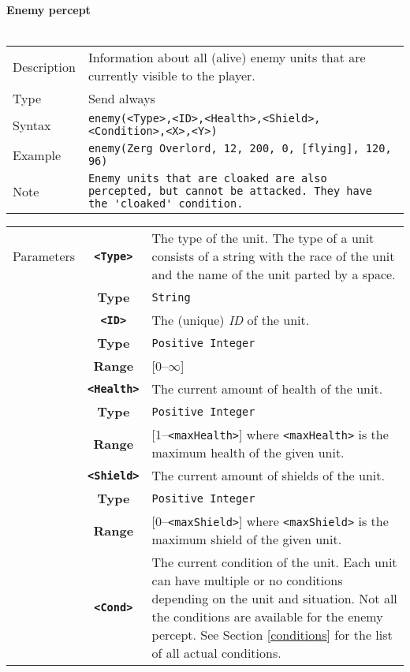 \noindent
\textbf{Enemy percept}\\
\\
\begin{tabularx}{\textwidth}{lX}
 Description & Information about all (alive) enemy units that are currently visible to the player. \\
 Type & Send always \\
 Syntax & \verb|enemy(<Type>,<ID>,<Health>,<Shield>,<Condition>,<X>,<Y>)| \\
 Example & \verb|enemy(Zerg Overlord, 12, 200, 0, [flying], 120, 96)| \\
 Note & \verb|Enemy units that are cloaked are also percepted, but cannot be attacked. They have the 'cloaked' condition.|
 \end{tabularx}
 \begin{tabularx}{\textwidth}{l | c | p{8cm}|}
 \cline{2-3}
 Parameters & \textbf{\verb|<Type>|} & The type of the unit. The type of a unit consists of a string with the race of            the unit and the name of the unit parted by a space. \\
            & \textbf{Type} & \verb|String| \\
            \cline{2-3}
            & \textbf{\verb|<ID>|} & The (unique) \textit{ID} of the unit.\\
            & \textbf{Type} & \verb|Positive Integer| \\
            & \textbf{Range} & [0--$\infty$] \\
            \cline{2-3}
            & \textbf{\verb|<Health>|} & The current amount of health of the unit.\\
            & \textbf{Type} & \verb|Positive Integer| \\
            & \textbf{Range} & [1--\verb|<maxHealth>|] where \verb|<maxHealth>| is the maximum health of the given unit.\\
            \cline{2-3}
            & \textbf{\verb|<Shield>|} & The current amount of shields of the unit. \\
            & \textbf{Type} & \verb|Positive Integer| \\
            & \textbf{Range} & [0--\verb|<maxShield>|] where \verb|<maxShield>| is the maximum shield of the given unit. \\
            \cline{2-3}
            & \textbf{\verb|<Cond>|} & The current condition of the unit. Each unit can have multiple or no conditions depending on the unit and situation. Not all the conditions are available for the enemy percept. See Section \ref{conditions} for the list of all actual conditions.\\

\end{tabularx}
